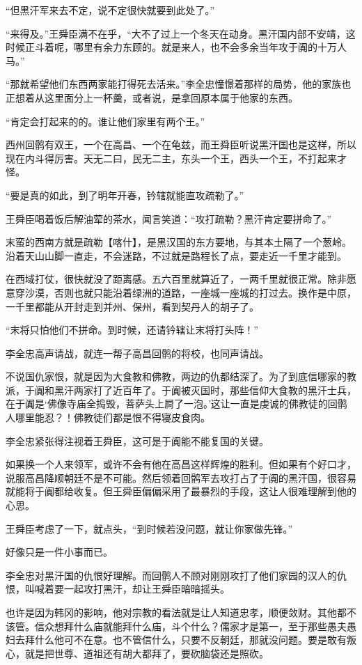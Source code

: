 “但黑汗军来去不定，说不定很快就要到此处了。”

“来得及。”王舜臣满不在乎，“大不了过上一个冬天在动身。黑汗国内部不安靖，这时候正斗着呢，哪里有余力东顾的。就是来人，也不会多余当年攻于阗的十万人马。”

“那就希望他们东西两家能打得死去活来。”李全忠憧憬着那样的局势，他的家族也正想着从这里面分上一杯羹，或者说，是拿回原本属于他家的东西。

“肯定会打起来的的。谁让他们家里有两个王。”

西州回鹘有双王，一个在高昌、一个在龟兹，而王舜臣听说黑汗国也是这样，所以现在内斗得厉害。天无二曰，民无二主，东头一个王，西头一个王，不打起来才怪。

“要是真的如此，到了明年开春，钤辖就能直攻疏勒了。”

王舜臣喝着饭后解油荤的茶水，闻言笑道：“攻打疏勒？黑汗肯定要拼命了。”

末蛮的西南方就是疏勒【喀什】，是黑汉国的东方要地，与其本土隔了一个葱岭。沿着天山山脚一直走，不会迷路，不过就是路程长了点，要走近一千里才能到。

在西域打仗，很快就没了距离感。五六百里就算近了，一两千里就很正常。除非愿意穿沙漠，否则也就只能沿着绿洲的道路，一座城一座城的打过去。换作是中原，一千里都能从开封走到并州、保州，看到契丹人的胡子了。

“末将只怕他们不拼命。到时候，还请钤辖让末将打头阵！”

李全忠高声请战，就连一帮子高昌回鹘的将校，也同声请战。

不说国仇家恨，就是因为大食教和佛教，两边的仇都结深了。为了到底信哪家的教派，于阗和黑汗两家打了近百年了。于阗被灭国时，那些信仰大食教的黑汗士兵，在于阗是‘佛像寺庙全捣毁，菩萨头上屙了一泡。’这让一直是虔诚的佛教徒的回鹘人哪里能忍？！佛教徒们都是恨不得寝皮食肉。

李全忠紧张得注视着王舜臣，这可是于阗能不能复国的关键。

如果换一个人来领军，或许不会有他在高昌这样辉煌的胜利。但如果有个好口才，说服高昌降顺朝廷不是不可能。然后领着回鹘军去攻打占了于阗的黑汗国，很容易就能将于阗都给收复。但王舜臣偏偏采用了最暴烈的手段，这让人很难理解到他的心思。

王舜臣考虑了一下，就点头，“到时候若没问题，就让你家做先锋。”

好像只是一件小事而已。

李全忠对黑汗国的仇恨好理解。而回鹘人不顾对刚刚攻打了他们家园的汉人的仇恨，叫喊着要一起攻打黑汗，却让王舜臣暗暗摇头。

也许是因为韩冈的影响，他对宗教的看法就是让人知道忠孝，顺便敛财。其他都不该管。信众想拜什么庙就能拜什么庙，斗个什么？儒家才是第一，至于那些愚夫愚妇去拜什么他可不在意。也不管信什么，只要不反朝廷，那就没问题。要是敢有叛心，就是把世尊、道祖还有胡大都拜了，要砍脑袋还是照砍。

